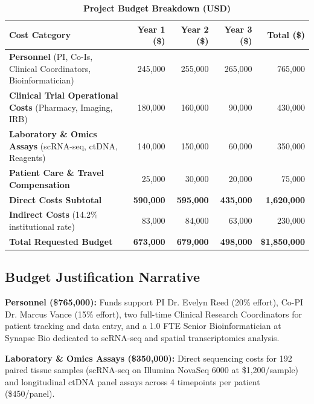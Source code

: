 \documentclass[10pt,a4paper]{article}
\begin{document}
\begin{table}[htbp]
\caption{\textbf{Project Budget Breakdown (USD)}}
\vspace{-0.4em}
\small
\begin{tabularx}{\textwidth}{X r r r r}
\toprule
\rowcolor{HeaderBg} \textbf{Cost Category} & \textbf{Year 1 (\$)} & \textbf{Year 2 (\$)} & \textbf{Year 3 (\$)} & \textbf{Total (\$)} \\
\midrule
\textbf{Personnel} (PI, Co-Is, Clinical Coordinators, Bioinformatician) & 245,000 & 255,000 & 265,000 & 765,000 \\
\textbf{Clinical Trial Operational Costs} (Pharmacy, Imaging, IRB) & 180,000 & 160,000 & 90,000 & 430,000 \\
\textbf{Laboratory \& Omics Assays} (scRNA-seq, ctDNA, Reagents) & 140,000 & 150,000 & 60,000 & 350,000 \\
\textbf{Patient Care \& Travel Compensation} & 25,000 & 30,000 & 20,000 & 75,000 \\
\midrule
\textbf{Direct Costs Subtotal} & \textbf{590,000} & \textbf{595,000} & \textbf{435,000} & \textbf{1,620,000} \\
\textbf{Indirect Costs} (14.2\% institutional rate) & 83,000 & 84,000 & 63,000 & 230,000 \\
\midrule
\rowcolor{HeaderBg} \textbf{\color{PrimaryNavy}Total Requested Budget} & \textbf{673,000} & \textbf{679,000} & \textbf{498,000} & \textbf{\$1,850,000} \\
\bottomrule
\end{tabularx}
\end{table}

\subsection{Budget Justification Narrative}
\textbf{Personnel (\$765,000):} Funds support PI Dr. Evelyn Reed (20\% effort), Co-PI Dr. Marcus Vance (15\% effort), two full-time Clinical Research Coordinators for patient tracking and data entry, and a 1.0 FTE Senior Bioinformatician at Synapse Bio dedicated to scRNA-seq and spatial transcriptomics analysis.

\textbf{Laboratory \& Omics Assays (\$350,000):} Direct sequencing costs for 192 paired tissue samples (scRNA-seq on Illumina NovaSeq 6000 at \$1,200/sample) and longitudinal ctDNA panel assays across 4 timepoints per patient (\$450/panel).

\vspace{0.4em}
\end{document}
